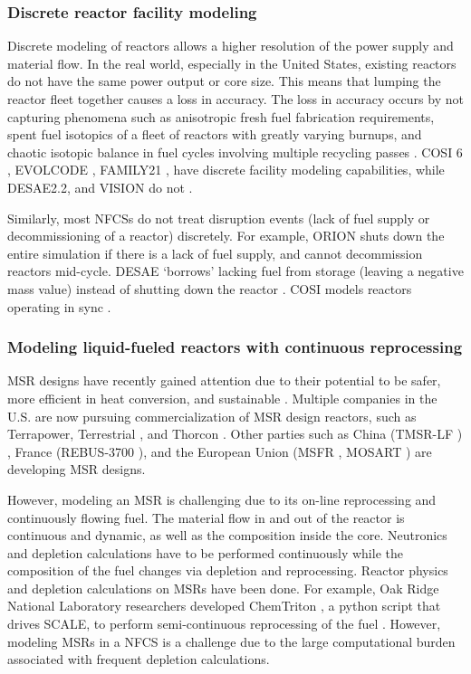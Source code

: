 \subsubsection{Discrete reactor facility modeling}
Discrete modeling of reactors allows a higher resolution of the power supply and
material flow. In the real world, especially in the United States, existing
reactors do not have the same power output or core size. This means that
lumping the reactor fleet together causes a loss in accuracy. The loss in
accuracy occurs by not capturing phenomena such as anisotropic fresh fuel
fabrication requirements, spent fuel isotopics of a fleet of reactors
with greatly varying burnups, and chaotic isotopic balance in fuel
cycles involving multiple recycling passes \cite{huff_next_2010}.
COSI 6 \cite{eschbach_new_2013}, EVOLCODE \cite{alvarez-velarde_validation_2014},
FAMILY21 \cite{oecd_nuclear_2009},
have discrete facility modeling capabilities, while
DESAE2.2\cite{tsibulskiy_desae_2006}, and VISION \cite{jacobson_verifiable_2010} do
not \cite{boucher_international_2010}.

Similarly, most \glspl{NFCS} do not treat disruption events (lack of fuel supply
or decommissioning of a reactor)
discretely. For example, ORION shuts down the entire simulation if there
is a lack of fuel supply, and cannot decommission reactors mid-cycle.
DESAE `borrows' lacking fuel from storage (leaving a
negative mass value) instead of shutting down the reactor \cite{mccarthy_benchmark_2012}.
COSI models reactors operating in sync \cite{boucher_benchmark_2012}.


\subsubsection{Modeling liquid-fueled reactors with continuous reprocessing}
\label{sec:msr}
\gls{MSR} designs have recently gained attention due to 
their potential to be 
safer, more efficient in heat conversion, and sustainable \cite{serp_molten_2014}.
Multiple companies in the U.S. are now pursuing
commercialization of \gls{MSR} design reactors, such as Terrapower, Terrestrial \cite{leblanc_18_2017}, and
Thorcon \cite{jorgensen_19_2017}. Other parties such as China (TMSR-LF \cite{dai_17_2017}) ,
France (REBUS-3700 \cite{mourogov_potentialities_2006}),
and the European Union (MSFR \cite{heuer_towards_2014}, MOSART \cite{ignatiev_molten_2014})
are developing \gls{MSR} designs.

However, modeling an \gls{MSR} is challenging due to its on-line reprocessing
and continuously flowing fuel.
The material flow in and out of the reactor is continuous and dynamic, as well as the
composition inside the core.
Neutronics and depletion calculations have to be performed continuously while
the composition of the fuel changes via depletion and reprocessing.
Reactor physics and depletion calculations
on \glspl{MSR} have been done. For example,
Oak Ridge National Laboratory researchers developed
ChemTriton \cite{powers_new_2013}, a python script that drives SCALE,
to perform semi-continuous reprocessing of the fuel \cite{powers_inventory_2014, betzler_fuel_2018}.
However, modeling \glspl{MSR} in a \gls{NFCS} is a challenge
due to the large computational burden associated with frequent depletion calculations.

